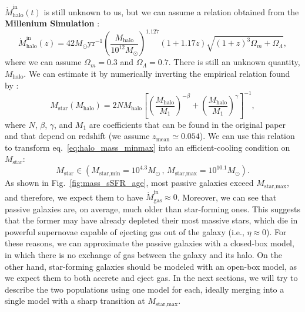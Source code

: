 \documentclass[fleqn,usenatbib]{mnras}
\begin{document}
$\dot{M}_\text{halo}^\text{in}(t)$ is still unknown to us, but we can assume a relation obtained from the \textbf{Millenium Simulation} \citep{McBride_2009}:
{\fontsize{7.9pt}{7.9pt}\begin{equation}
    \dot{M}_\text{halo}^\text{in}(z) = 42 M_{\odot} \text{yr}^{-1} \left(\dfrac{M_\text{halo}}{10^{12}M_{\odot}}\right)^{1.127} (1+1.17z) \sqrt{(1+z)^3 \Omega_m + \Omega_\Lambda},
	\label{eq:mcbride}
\end{equation}}
where we can assume $\Omega_m=0.3$ and $\Omega_\Lambda=0.7$.
There is still an unknown quantity, $M_\text{halo}$. We can estimate it by numerically inverting the empirical relation found by \citet{Moster_2012}:
\begin{equation}
    M_\text{star} \left(M_\text{halo}\right) = 2N M_\text{halo} \left[\left(\dfrac{M_\text{halo}}{M_1}\right)^{-\beta} + \left(\dfrac{M_\text{halo}}{M_1}\right)^\gamma\right]^{-1},
	\label{eq:moster}
\end{equation}
where $N$, $\beta$, $\gamma$, and $M_1$ are coefficients that can be found in the original paper and that depend on redshift (we assume $z_{\text{mean}} \simeq 0.054$). We can use this relation to transform eq.~\ref{eq:halo_mass_minmax} into an efficient-cooling condition on $M_\text{star}$:
\begin{equation}
    M_\text{star} \in \left( M_\text{star,min}=10^{4.3} M_\odot \, , \, M_\text{star,max}=10^{10.1} M_\odot \right).
	\label{eq:star_mass_minmax}
\end{equation}
As shown in Fig.~\ref{fig:mass_sSFR_age}, most passive galaxies exceed $M_\text{star,max}$, and therefore, we expect them to have $\dot{M}_\text{gas}^\text{in} \approx 0$.
Moreover, we can see that passive galaxies are, on average, much older than star-forming ones. This suggests that the former may have already depleted their most massive stars, which die in powerful supernovae capable of ejecting gas out of the galaxy (i.e., $\eta \approx 0$). For these reasons, we can approximate the passive galaxies with a closed-box model, in which there is no exchange of gas between the galaxy and its halo. On the other hand, star-forming galaxies should be modeled with an open-box model, as we expect them to both accrete and eject gas. In the next sections, we will try to describe the two populations using one model for each, ideally merging into a single model with a sharp transition at $M_\text{star,max}$.


\end{document}
